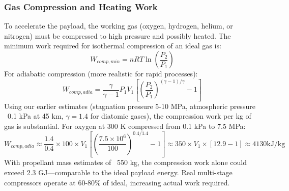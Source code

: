 \subsubsection{Gas Compression and Heating Work}
To accelerate the payload, the working gas (oxygen, hydrogen, helium, or nitrogen) must be compressed to high pressure and possibly heated. The minimum work required for isothermal compression of an ideal gas is:
\begin{equation}
W_{comp,min} = nRT \ln\left(\frac{P_2}{P_1}\right)
\end{equation}
For adiabatic compression (more realistic for rapid processes):
\begin{equation}
W_{comp,adia} = \frac{\gamma}{\gamma-1} P_1 V_1 \left[ \left(\frac{P_2}{P_1}\right)^{(\gamma-1)/\gamma} - 1 \right]
\end{equation}
Using our earlier estimates (stagnation pressure 5-10 MPa, atmospheric pressure ~0.1 kPa at 45 km, $\gamma = 1.4$ for diatomic gases), the compression work per kg of gas is substantial. For oxygen at 300 K compressed from 0.1 kPa to 7.5 MPa:
\begin{equation}
W_{comp,adia} \approx \frac{1.4}{0.4} \times 100 \times V_1 \left[ \left(\frac{7.5 \times 10^6}{100}\right)^{0.4/1.4} - 1 \right] \approx 350 \times V_1 \times [12.9 - 1] \approx 4130  \text{kJ/kg}
\end{equation}
With propellant mass estimates of ~550 kg, the compression work alone could exceed 2.3 GJ—comparable to the ideal payload energy. Real multi-stage compressors operate at 60-80\% of ideal, increasing actual work required.

